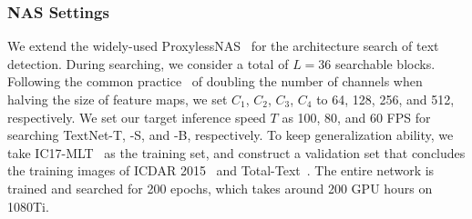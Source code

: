\documentclass[lettersize,journal]{IEEEtran}
\begin{document}
\subsubsection{NAS Settings}
We extend the widely-used ProxylessNAS~\cite{cai2018proxylessnas} for the architecture search of text detection.
During searching, we consider a total of $L = 36$ searchable blocks.
Following the common practice~\cite{he2016deep} of doubling the number of channels when halving the size of feature maps, we set $C_1$, $C_2$, $C_3$, $C_4$ to 64, 128, 256, and 512, respectively. 
We set our target inference speed $T$ as 100, 80, and 60 FPS for searching TextNet-T, -S, and -B, respectively.
To keep generalization ability, we take IC17-MLT~\cite{nayef2017icdar2017} as the training set, and construct a validation set that concludes the training images of ICDAR 2015~\cite{karatzas2015icdar} and Total-Text~\cite{ch2017total}.
The entire network is trained and searched for 200 epochs, which takes around 200 GPU hours on 1080Ti.




\begin{table}[!t]
    \small
    \centering
    \caption{Ablation studies of the erosion/dilation size $s$.
    According to these results, we set the erosion/dilation size $s$ to 9 by default in our experiments.
    }
    \label{tab:pooling_size}
\end{table}
\end{document}

